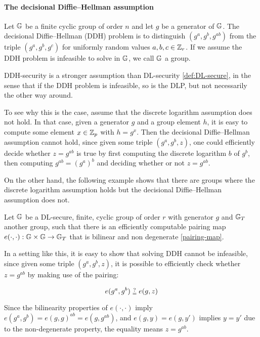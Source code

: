 \paragraph{The decisional Diffie--Hellman assumption}
\label{def:DDH-secure}
Let $\mathbb{G}$ be a finite cyclic group of order $n$ and let $g$ be a generator of $\mathbb{G}$. The decisional Diffie--Hellman (DDH) problem is to distinguish $(g^a,g^b, g^{ab})$ from the triple $(g^a,g^b,g^c)$ for uniformly random values $a,b,c\in \mathbb{Z}_r$. If we assume the DDH problem is infeasible to solve in $\mathbb{G}$, we call $\mathbb{G}$ a  group.

DDH-security is a stronger assumption than DL-security \ref{def:DL-secure}, in the sense that if the DDH problem is infeasible, so is the DLP, but not necessarily the other way around.

To see why this is the case, assume that the discrete logarithm assumption does not hold. In that case, given a generator $g$ and a group element $h$, it is easy to compute some element $x\in\mathbb{Z}_p$ with $h=g^x$. Then the decisional Diffie--Hellman assumption cannot hold, since given some triple $(g^a , g^b , z )$, one could efficiently decide whether $z = g^{ab}$ is true by first computing the discrete logarithm $b$ of  $g^b$, then computing $g^{ab}= (g^a)^b$ and deciding whether or not $z=g^{ab}$.

On the other hand, the following example shows that there are groups where the discrete logarithm assumption holds but the decisional  Diffie--Hellman assumption does not.

\begin{example}

Let $\mathbb{G}$ be a DL-secure, finite, cyclic group of order $r$ with generator $g$ and $\mathbb{G}_T$ another group, such that there is an efficiently computable pairing map $e(\cdot,\cdot): \mathbb{G} \times \mathbb{G} \to \mathbb{G}_T$ that is bilinear and non degenerate \ref{pairing-map}.

In a setting like this, it is easy to show that solving DDH cannot be infeasible, since given some  triple $(g^a, g^b, z)$, it is possible to efficiently check whether $z = g^{ab}$ by making use of the pairing:

\begin{equation}
e(g^a,g^b) \checkeq e(g,z)
\end{equation}

Since the bilinearity properties of $e(\cdot,\cdot)$ imply $e(g^a,g^b)= e(g,g)^{ab}= e(g,g^{ab})$, and $e(g,y)=e(g,y')$ implies $y=y'$ due to the non-degenerate property, the equality means $z=g^{ab}$.

\end{example}

